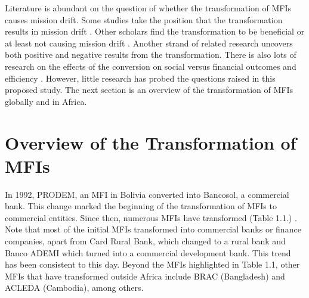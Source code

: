 \documentclass[a4paper,nobind]{templates/ociamthesis}
\begin{document}
Literature is abundant on the question of whether the transformation of MFIs causes mission drift. Some studies take the position that the transformation results in mission drift \autocite{mia2017mission,wagenaar2012institutional,lopatta2017sustainable,roberts2013endogeneity}. Other scholars find the transformation to be beneficial or at least not causing mission drift \autocite{im2015profits,lutzenkirchen2012microfinance,quayes2012depth,mersland2010microfinance}. Another strand of related research uncovers both positive and negative results from the transformation\autocite{kar2012does,caudill2009microfinance}. There is also lots of research on the effects of the conversion on social versus financial outcomes and efficiency \autocite{bogan2012capital,kar2012does,tchuigoua2014institutional,khachatryan2017performance}. However, little research has probed the questions raised in this proposed study. The next section is an overview of the transformation of MFIs globally and in Africa.

\hypertarget{overview-of-the-transformation-of-mfis}{%
\section{Overview of the Transformation of MFIs}\label{overview-of-the-transformation-of-mfis}}

\noindent In 1992, PRODEM, an MFI in Bolivia converted into Bancosol, a commercial bank. This change marked the beginning of the transformation of MFIs to commercial entities. Since then, numerous MFIs have transformed (Table 1.1.) . Note that most of the initial MFIs transformed into commercial banks or finance companies, apart from Card Rural Bank, which changed to a rural bank and Banco ADEMI which turned into a commercial development bank. This trend has been consistent to this day. Beyond the MFIs highlighted in Table 1.1, other MFIs that have transformed outside Africa include BRAC (Bangladesh) and ACLEDA (Cambodia), among others.
\end{document}
